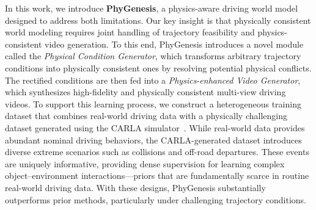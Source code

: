 \documentclass[runningheads]{llncs}
\begin{document}

In this work, we introduce \textbf{PhyGenesis}, a physics-aware driving world model designed to address both limitations. Our key insight is that physically consistent world modeling requires joint handling of trajectory feasibility and physics-consistent video generation. To this end, PhyGenesis introduces a novel module called the {\textit{Physical Condition Generator}}, which transforms arbitrary trajectory conditions into physically consistent ones by resolving potential physical conflicts. The rectified conditions are then fed into a {\textit{Physics-enhanced Video Generator}}, which synthesizes high-fidelity and physically consistent multi-view driving videos.
To support this learning process, we construct a heterogeneous training dataset that combines real-world driving data with a physically challenging dataset generated using the CARLA simulator~\cite{Dosovitskiy2017carla}. While real-world data provides abundant nominal driving behaviors, the CARLA-generated dataset introduces diverse extreme scenarios such as collisions and off-road departures. These events are uniquely informative, providing dense supervision for learning complex object–environment interactions—priors that are fundamentally scarce in routine real-world driving data.
With these designs, PhyGenesis substantially outperforms prior methods, particularly under challenging trajectory conditions.
\end{document}
